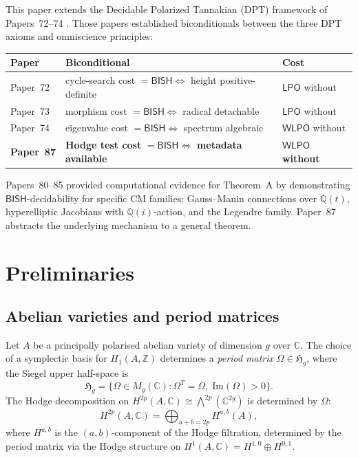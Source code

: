 \documentclass[11pt]{article}
\theoremstyle{plain}
\theoremstyle{definition}
\theoremstyle{remark}
\newcommand{\Z}{\mathbb{Z}}
\newcommand{\Q}{\mathbb{Q}}
\newcommand{\C}{\mathbb{C}}
\newcommand{\Hg}{\mathfrak{H}_g}
\newcommand{\BISH}{\ensuremath{\mathsf{BISH}}}
\newcommand{\LPO}{\ensuremath{\mathsf{LPO}}}
\newcommand{\WLPO}{\ensuremath{\mathsf{WLPO}}}
\begin{document}
This paper extends the Decidable Polarized Tannakian (DPT) framework of Papers~72--74 \cite{P72,P73,P74}. Those papers established biconditionals between the three DPT axioms and omniscience principles:
\begin{center}
\begin{tabular}{lll}
\toprule
\textbf{Paper} & \textbf{Biconditional} & \textbf{Cost} \\
\midrule
Paper~72 & cycle-search cost $= \BISH \iff$ height positive-definite & $\LPO$ without \\
Paper~73 & morphism cost $= \BISH \iff$ radical detachable & $\LPO$ without \\
Paper~74 & eigenvalue cost $= \BISH \iff$ spectrum algebraic & $\WLPO$ without \\
\textbf{Paper~87} & \textbf{Hodge test cost} $= \BISH \iff$ \textbf{metadata available} & $\WLPO$ \textbf{without} \\
\bottomrule
\end{tabular}
\end{center}
Papers~80--85 \cite{P80,P81,P82,P83,P84,P85} provided computational evidence for Theorem~A by demonstrating $\BISH$-decidability for specific CM families: Gauss--Manin connections over $\Q(t)$, hyperelliptic Jacobians with $\Q(i)$-action, and the Legendre family. Paper~87 abstracts the underlying mechanism to a general theorem.


\section{Preliminaries}\label{sec:prelim}

\subsection{Abelian varieties and period matrices}

Let $A$ be a principally polarised abelian variety of dimension $g$ over $\C$. The choice of a symplectic basis for $H_1(A, \Z)$ determines a \emph{period matrix} $\Omega \in \Hg$, where the Siegel upper half-space is
\[
\Hg = \{ \Omega \in M_g(\C) : \Omega^T = \Omega, \; \mathrm{Im}(\Omega) > 0 \}.
\]
The Hodge decomposition on $H^{2p}(A, \C) \cong \bigwedge^{2p}(\C^{2g})$ is determined by $\Omega$:
\[
H^{2p}(A, \C) = \bigoplus_{a+b=2p} H^{a,b}(A),
\]
where $H^{a,b}$ is the $(a,b)$-component of the Hodge filtration, determined by the period matrix via the Hodge structure on $H^1(A, \C) = H^{1,0} \oplus H^{0,1}$.
\end{document}

